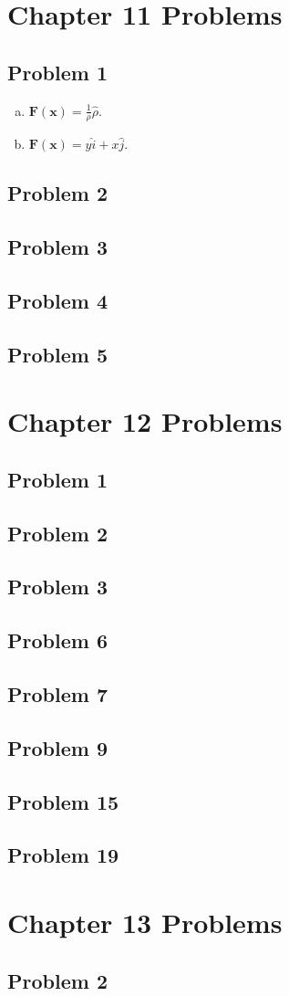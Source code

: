 \documentclass[10pt]{mypackage}
\begin{document}
\RaggedRight
\section{Chapter 11 Problems}%
\subsection{Problem 1}%
\begin{enumerate}[(a)]
  \item $\mathbf{F}\left(\mathbf{x}\right) = \frac{1}{\rho}\hat{\rho}$.
  \item $\mathbf{F}\left(\mathbf{x}\right) = y\hat{i} + x\hat{j}$.
\end{enumerate}
\subsection{Problem 2}%
\subsection{Problem 3}%
\subsection{Problem 4}%
\subsection{Problem 5}%

\section{Chapter 12 Problems}%
\subsection{Problem 1}%
\subsection{Problem 2}%
\subsection{Problem 3}%
\subsection{Problem 6}%
\subsection{Problem 7}%
\subsection{Problem 9}%
\subsection{Problem 15}%
\subsection{Problem 19}%

\section{Chapter 13 Problems}%
\subsection{Problem 2}%
\end{document}
